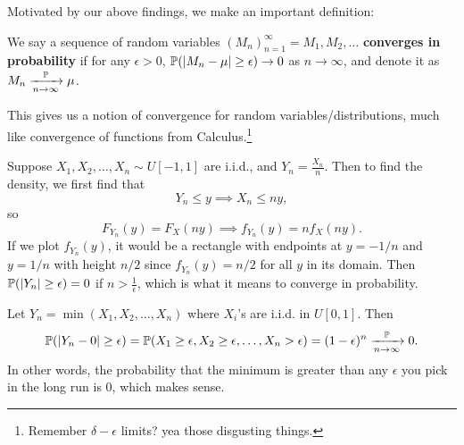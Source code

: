 \documentclass[11 pt]{scrartcl}
\begin{document}
Motivated by our above findings, we make an important definition: 

\begin{definition}
    We say a sequence of random variables $(M_n)_{n=1}^\infty = M_1, M_2, \dots$ \textbf{converges in probability} if for any $\epsilon > 0$, $\mathbb P(|M_n-\mu| \geq \epsilon)\to 0$ as $n\to\infty$, and denote it as $M_n\xrightarrow[n\to\infty]{\mathbb P} \mu$. 
\end{definition}

This gives us a notion of convergence for random variables/distributions, much like convergence of functions from Calculus.\footnote{Remember $\delta - \epsilon$ limits? yea those disgusting things.}

\begin{example}
    Suppose $X_1, X_2, \dots, X_n \sim U[-1, 1]$ are i.i.d., and $Y_n = \frac{X_n}{n}$. Then to find the density, we first find that 
    \[ Y_n \leq y \implies X_n \leq ny,\]
    so 
    \[ F_{Y_n}(y) = F_X(ny) \implies f_{Y_n}(y) = n f_X(ny). \] 
    If we plot $f_{Y_n}(y)$, it would be a rectangle with endpoints at $y = -1/n$ and $y = 1/n$ with height $n/2$ since $f_{Y_n}(y) = n/2$ for all $y$ in its domain. Then $\mathbb P(|Y_n| \geq \epsilon) = 0$ if $n > \frac{1}{\epsilon}$, which is what it means to converge in probability. 
\end{example}

\begin{example}
    Let $Y_n = \min(X_1, X_2, \dots, X_n)$ where $X_i$'s are i.i.d. in $U[0,1]$. Then 
    \[ \mathbb P(|Y_n - 0| \geq \epsilon) = \mathbb P(X_1\geq \epsilon, X_2\geq \epsilon, \dots, X_n > \epsilon) = (1-\epsilon)^n \xrightarrow[n\to\infty]{\mathbb P} 0 .\] 
    In other words, the probability that the minimum is greater than any $\epsilon$ you pick in the long run is $0$, which makes sense. 
\end{example}
\end{document}
